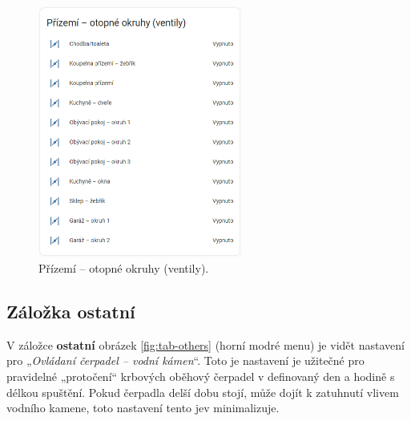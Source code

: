 \begin{Czech}
\begin{figure}[H]
    \centering
    \includegraphics[width=0.6\textwidth]{pictures/czech/software/heating-circuits-ground-floor.png}
    \caption{Přízemí – otopné okruhy (ventily).}
    \label{fig:heating-circuits-ground-floor2}
\end{figure}
\end{Czech}


\newpage
\begin{Czech}
\subsection{Záložka ostatní}
\end{Czech}

\begin{Czech}
V záložce \textbf{ostatní} obrázek \ref{fig:tab-others} (horní modré menu) je vidět nastavení pro „\textit{Ovládaní čerpadel – vodní kámen}“. Toto je nastavení je užitečné pro pravidelné „protočení“ krbových oběhový čerpadel v definovaný den a hodině s délkou spuštění. Pokud čerpadla delší dobu stojí, může dojít k zatuhnutí vlivem vodního kamene, toto nastavení tento jev minimalizuje. 
\end{Czech}


